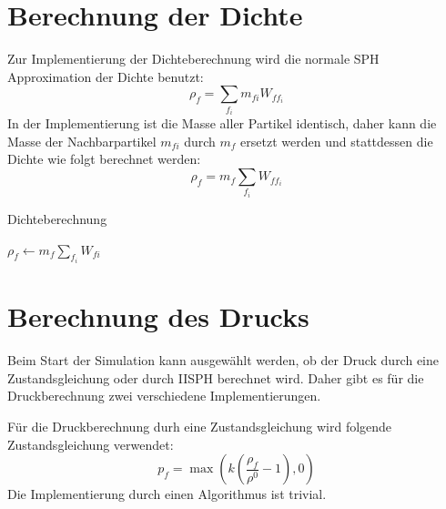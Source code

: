 \documentclass{scrreprt}
\begin{document}
\section{Berechnung der Dichte}
Zur Implementierung der Dichteberechnung wird die normale SPH Approximation der Dichte benutzt:
\begin{equation}
    \rho_f = \sum_{f_i} m_{fi} W_{f f_i}
\end{equation}
In der Implementierung ist die Masse aller Partikel identisch, daher kann die Masse der Nachbarpartikel $m_{fi}$ durch $m_f$ ersetzt werden
und stattdessen die Dichte wie folgt berechnet werden:
\begin{equation}
    \rho_f = m_f \sum_{f_i} W_{f f_i}
\end{equation}

\begin{algorithm}
    \caption{Dichteberechnung}
    \label{alg:density}
    \begin{algorithmic}
            \State $\rho_f \gets m_f \sum_{f_i} W_{fi}$
        \EndFor
    \end{algorithmic}
\end{algorithm}

\section{Berechnung des Drucks}
Beim Start der Simulation kann ausgewählt werden, ob der Druck durch eine Zustandsgleichung oder durch IISPH berechnet wird.
Daher gibt es für die Druckberechnung zwei verschiedene Implementierungen.

Für die Druckberechnung durh eine Zustandsgleichung wird folgende Zustandsgleichung verwendet:
\begin{equation}
    p_f = \max\left(k \left(\frac{\rho_f}{\rho^0} - 1\right), 0\right)
\end{equation}
Die Implementierung durch einen Algorithmus ist trivial.

\end{document}
